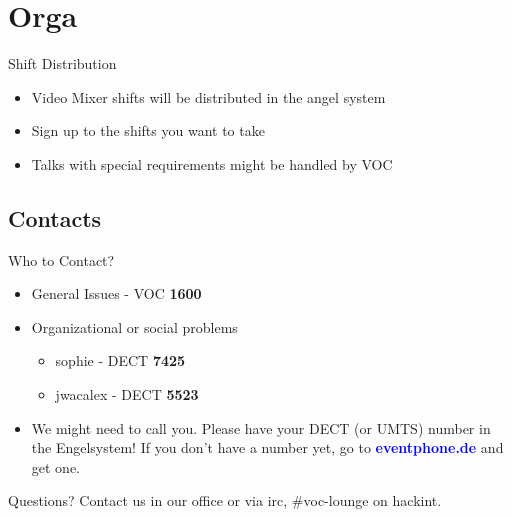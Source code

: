 \documentclass[aspectratio=169]{beamer}
\begin{document}
\section{Orga} 		
\begin{frame}{Shift Distribution}		%
\begin{itemize}
	\item Video Mixer shifts will be distributed in the angel system
	\item Sign up to the shifts you want to take
	\item Talks with special requirements might be handled by VOC
\end{itemize} 
\end{frame}

\subsection{Contacts}			%
\begin{frame}{Who to Contact?}
\begin{itemize}
	\item General Issues - VOC \textbf{1600}
	\item Organizational or social problems 
	\begin{itemize}
		\item sophie - DECT  \textbf{7425}
		\item jwacalex - DECT \textbf{5523}
	\end{itemize}
	\item We might need to call you. Please have your DECT (or UMTS) number in the Engelsystem! If you don't have a number yet, go to 
	\textcolor{blue}{\textbf{eventphone.de}} and get one. 
\end{itemize} 
\end{frame}

\begin{frame}{Questions?}
Contact us in our office or via irc, \#voc-lounge on hackint.
\end{frame}
\end{document}
